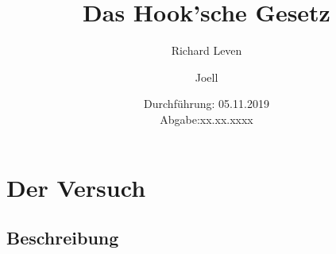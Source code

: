\documentclass{scrartcl}
\title{Das Hook'sche Gesetz}
\author{Richard Leven \and Joell}
\date{
    Durchführung: 05.11.2019\\
    Abgabe:xx.xx.xxxx
}
\begin{document}
\maketitle
\section{Der Versuch}
\subsection{Beschreibung}

\end{document}
